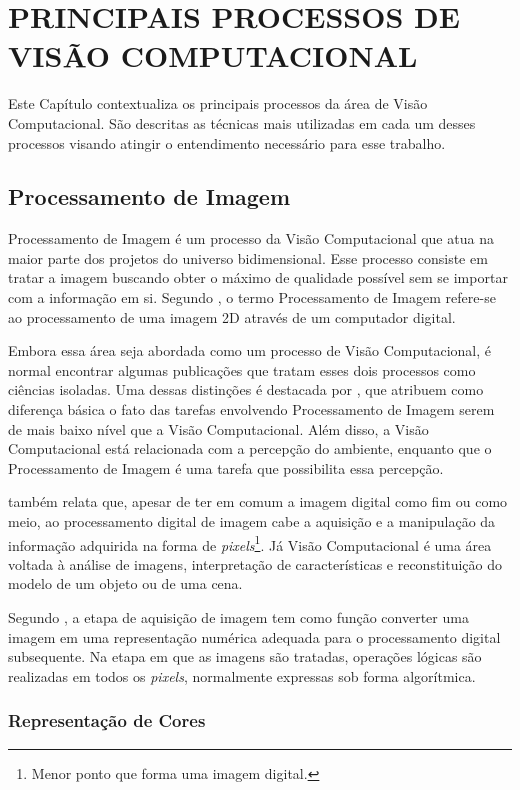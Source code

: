 \chapter{PRINCIPAIS PROCESSOS DE VISÃO COMPUTACIONAL}

Este Capítulo contextualiza os principais processos da área de Visão Computacional. São descritas as técnicas mais utilizadas em cada um desses processos visando atingir o entendimento necessário para esse trabalho.

\section{Processamento de Imagem}

Processamento de Imagem é um processo da Visão Computacional que atua na maior parte dos projetos do universo bidimensional. Esse processo consiste em tratar a imagem buscando obter o máximo de qualidade possível sem se importar com a informação em si. Segundo , o termo Processamento de Imagem refere-se ao processamento de uma imagem 2D através de um computador digital.

Embora essa área seja abordada como um processo de Visão Computacional, é normal encontrar algumas publicações que tratam esses dois processos como ciências isoladas. Uma dessas distinções é destacada por , que atribuem como diferença básica o fato das tarefas envolvendo Processamento de Imagem serem de mais baixo nível que a Visão Computacional. Além disso, a Visão Computacional está relacionada com a percepção do ambiente, enquanto que o Processamento de Imagem é uma tarefa que possibilita essa percepção.

 também relata que, apesar de ter em comum a imagem digital como fim ou como meio, ao processamento digital de imagem cabe a aquisição e a manipulação da informação adquirida na forma de \textit{pixels}\footnote{Menor ponto que forma uma imagem digital.}. Já Visão Computacional é uma área voltada à análise de imagens, interpretação de características e reconstituição do modelo de um objeto ou de uma cena.

Segundo , a etapa de aquisição de imagem tem como função converter uma imagem em uma representação numérica adequada para o processamento digital subsequente. Na etapa em que as imagens são tratadas, operações lógicas são realizadas em todos os \textit{pixels}, normalmente expressas sob forma algorítmica.

\subsection{Representação de Cores}

